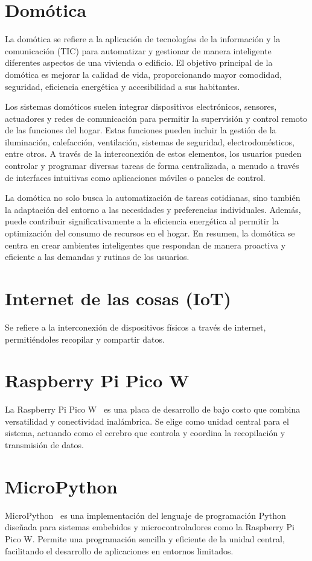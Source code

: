 \section{Domótica}\label{concepto:Domótica}
La domótica se refiere a la aplicación de tecnologías de la información y la comunicación (TIC) para automatizar y gestionar de manera inteligente diferentes aspectos de una vivienda o edificio. El objetivo principal de la domótica es mejorar la calidad de vida, proporcionando mayor comodidad, seguridad, eficiencia energética y accesibilidad a sus habitantes.

Los sistemas domóticos suelen integrar dispositivos electrónicos, sensores, actuadores y redes de comunicación para permitir la supervisión y control remoto de las funciones del hogar. Estas funciones pueden incluir la gestión de la iluminación, calefacción, ventilación, sistemas de seguridad, electrodomésticos, entre otros. A través de la interconexión de estos elementos, los usuarios pueden controlar y programar diversas tareas de forma centralizada, a menudo a través de interfaces intuitivas como aplicaciones móviles o paneles de control.

La domótica no solo busca la automatización de tareas cotidianas, sino también la adaptación del entorno a las necesidades y preferencias individuales. Además, puede contribuir significativamente a la eficiencia energética al permitir la optimización del consumo de recursos en el hogar. En resumen, la domótica se centra en crear ambientes inteligentes que respondan de manera proactiva y eficiente a las demandas y rutinas de los usuarios.

\section{Internet de las cosas (IoT)}
Se refiere a la interconexión de dispositivos físicos a través de internet, permitiéndoles recopilar y compartir datos.


\section{Raspberry Pi Pico W}
La Raspberry Pi Pico W~\cite{misc:RPiPicoW} es una placa de desarrollo de bajo costo que combina versatilidad y conectividad inalámbrica. Se elige como unidad central para el sistema, actuando como el cerebro que controla y coordina la recopilación y transmisión de datos.

\section{MicroPython}
MicroPython~\cite{wiki:micropython} es una implementación del lenguaje de programación Python diseñada para sistemas embebidos y microcontroladores como la Raspberry Pi Pico W. Permite una programación sencilla y eficiente de la unidad central, facilitando el desarrollo de aplicaciones en entornos limitados.

